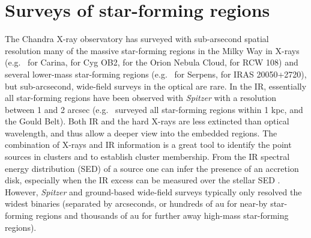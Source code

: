 \documentclass[12pt]{article}
\begin{document}
\section{Surveys of star-forming regions}
The Chandra X-ray observatory has surveyed with sub-arsecond spatial resolution  many of the massive star-forming regions in the Milky Way
in X-rays (e.g.\ \citealt{2011ApJS..194....1T} for Carina,
\citealt{2010ApJ...713..871W} for Cyg OB2, \citealt{2005ApJS..160..379F} for
the Orion Nebula Cloud, \citealt{2008AJ....135..693W} for RCW 108) and 
several lower-mass star-forming regions
(e.g.\ \citealt{2018AJ....155..241W} for Serpens, \citealt{2012AJ....144..101G}
for IRAS 20050+2720), but sub-arcsecond, wide-field surveys in the optical are rare.
In the IR, essentially
all star-forming regions have been observed with \emph{Spitzer} with a resolution between 1 and 2 arcsec
(e.g.\ \citealt{2009ApJS..184...18G} surveyed all star-forming regions within 1
kpc, and \citealt{2015ApJS..220...11D} the Gould Belt). Both IR and the hard
X-rays are less extincted than optical wavelength, and thus allow a
deeper view into the embedded regions. The combination of X-rays and IR information
is a great tool to identify the point sources in clusters and to establish
cluster membership. From the IR spectral energy distribution (SED) of a source one can
infer the presence of an accretion disk, especially when the IR excess can be measured over the stellar SED \citep{2009ApJS..184...18G}. However, \emph{Spitzer} and ground-based wide-field surveys typically only resolved the widest binaries (separated by arcseconds, or hundreds of au for near-by star-forming regions and thousands of au for further away high-mass star-forming regions).
\end{document}
